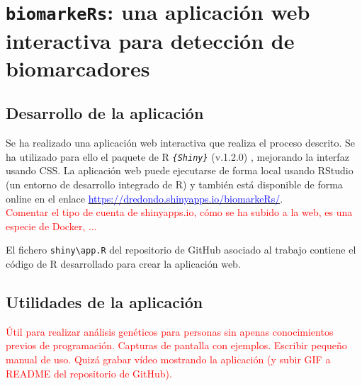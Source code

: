 \chapter{\texttt{biomarkeRs}: una aplicación web interactiva para detección de biomarcadores}

\section{Desarrollo de la aplicación}

Se ha realizado una aplicación web interactiva que realiza el proceso descrito. Se ha utilizado para ello el paquete de R \textit{\texttt{\{Shiny\}}} (v.1.2.0) \cite{Chang2020}, mejorando la interfaz usando CSS. La aplicación web puede ejecutarse de forma local usando RStudio (un entorno de desarrollo integrado de R) \cite{RStudioTeam2020} y también está disponible de forma online en el enlace \href{https://dredondo.shinyapps.io/biomarkeRs/}{\textcolor{blue}{https://dredondo.shinyapps.io/biomarkeRs/}}.\\

\textcolor{red}{Comentar el tipo de cuenta de shinyapps.io, cómo se ha subido a la web, es una especie de Docker, ...}

El fichero \texttt{shiny\textbackslash app.R} del repositorio de GitHub asociado al trabajo \cite{Redondo-Sanchez2020}  contiene el código de R desarrollado para crear la aplicación web.\\

\section{Utilidades de la aplicación}

\textcolor{red}{Útil para realizar análisis genéticos para personas sin apenas conocimientos previos de programación. Capturas de pantalla con ejemplos. Escribir pequeño manual de uso. Quizá grabar vídeo mostrando la aplicación (y subir GIF a README del repositorio de GitHub).}